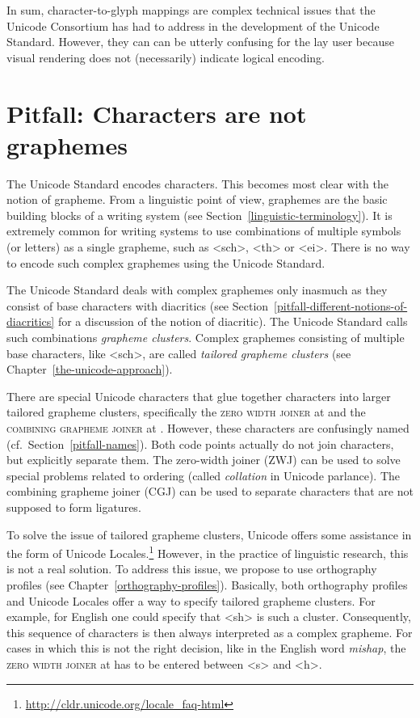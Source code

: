 In sum, character-to-glyph mappings are complex technical issues that the
Unicode Consortium has had to address in the development of the Unicode
Standard. However, they can can be utterly confusing for the lay user because visual
rendering does not (necessarily) indicate logical encoding.

\section{Pitfall: Characters are not graphemes}
\label{pitfall-characters-are-not-graphemes}

The Unicode Standard encodes characters. This becomes most clear with the notion of grapheme.
From a linguistic point of view, graphemes are the basic building blocks of a
writing system (see Section~\ref{linguistic-terminology}). It is extremely
common for writing systems to use 
combinations of multiple symbols (or letters) as a single grapheme, such as <sch>, <th> or <ei>.
There is no way to encode such complex graphemes using the Unicode Standard.

The Unicode Standard deals with complex graphemes only inasmuch as they consist of
base characters with diacritics (see
Section~\ref{pitfall-different-notions-of-diacritics} for a discussion of the
notion of diacritic). The Unicode Standard calls such combinations \textit{grapheme
clusters}. Complex graphemes consisting of multiple base characters,
like <sch>, are called \textit{tailored grapheme clusters} (see
Chapter~\ref{the-unicode-approach}).

There are special Unicode characters that 
glue together characters into larger tailored grapheme clusters,
specifically the \textsc{zero width joiner} at  and the
\textsc{combining grapheme joiner} at . However, these characters are
confusingly named (cf.~Section~\ref{pitfall-names}). Both code points actually do
not join characters, but explicitly separate them. The zero-width joiner (ZWJ)
can be used to solve special problems related to ordering (called \textit{collation}
in Unicode parlance). The combining grapheme joiner (CGJ) can be used to
separate characters that are not supposed to form ligatures. 

To solve the issue of tailored grapheme clusters, Unicode offers some assistance
in the form of Unicode Locales.\footnote{\url{http://cldr.unicode.org/locale_faq-html}} 
However, in the practice of
linguistic research, this is not a real solution. To address this issue, we propose to
use orthography profiles (see Chapter~\ref{orthography-profiles}). Basically,
both orthography profiles and Unicode Locales offer a way to specify
tailored grapheme clusters. For example, for English one could specify that <sh>
is such a cluster. Consequently, this sequence of characters is then always
interpreted as a complex grapheme. For cases in which this is not the right
decision, like in the English word \textit{mishap}, the \textsc{zero width
joiner} at  has to be entered between <s> and <h>.

